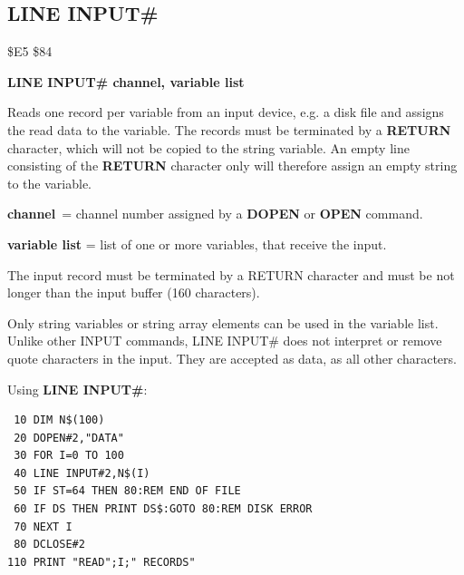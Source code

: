 \subsection{LINE INPUT\#}
\begin{description}[leftmargin=2cm,style=nextline]
\item [Token:] \$E5 \$84
\item [Format:] {\bf LINE INPUT\# channel, variable list}
\item [Usage:] Reads one record per variable from an input device,
               e.g. a disk file
               and assigns the read data to the variable.
               The records must be terminated by a {\bf RETURN}
               character, which will not be copied to the string variable.
               An empty line consisting of the {\bf RETURN} character only
               will therefore assign an empty string to the variable.

               {\bf channel} = channel number assigned
               by a {\bf DOPEN} or {\bf OPEN} command.

               {\bf variable list} = list of one or more
               variables, that receive the input.

               The input record must be terminated by a
               RETURN character and must be not longer than
               the input buffer (160 characters).

\item [Remarks:] Only string variables or string array elements
                 can be used in the variable list.
                 Unlike other INPUT commands, {LINE INPUT\#} does
                 not interpret or remove quote characters in the input.
                 They are accepted as data, as all other characters.

\item [Example:] Using {\bf LINE INPUT\#}:
\begin{tcolorbox}[colback=black,coltext=white]
\verbatimfont{\codefont}
\begin{verbatim}
 10 DIM N$(100)
 20 DOPEN#2,"DATA"
 30 FOR I=0 TO 100
 40 LINE INPUT#2,N$(I)
 50 IF ST=64 THEN 80:REM END OF FILE
 60 IF DS THEN PRINT DS$:GOTO 80:REM DISK ERROR
 70 NEXT I
 80 DCLOSE#2
110 PRINT "READ";I;" RECORDS"
\end{verbatim}
\end{tcolorbox}
\end{description}

